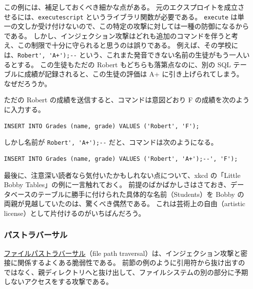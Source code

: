 \documentclass[uplatex]{jsarticle}
\def\label#1{}%
\begin{document}
\begin{rem}[複数文の実行を禁じても防御にはならない]\label{rem:ch10-execute-single-statement}
この例には、補足しておくべき細かな点がある。
元のエクスプロイトを成立させるには、\texttt{executescript} というライブラリ関数が必要である。
\texttt{execute} は単一の文しか受け付けないので、この特定の攻撃に対しては一種の防御になるからである。
しかし、インジェクション攻撃はどれも追加のコマンドを伴うと考え、この制限で十分に守られると思うのは誤りである。
例えば、その学校には、\verb|Robert', 'A+');--| という、これまた発音できない名前の生徒がもう一人いるとする。
この生徒もただの Robert もどちらも落第点なのに、別の SQL テーブルに成績が記録されると、この生徒の評価は A+ に引き上げられてしまう。
なぜだろうか。

ただの Robert の成績を送信すると、コマンドは意図どおり F の成績を次のように入力する。
\begin{verbatim}
INSERT INTO Grades (name, grade) VALUES ('Robert', 'F');
\end{verbatim}
しかし名前が \verb|Robert', 'A+');--| だと、コマンドは次のようになる。
\begin{verbatim}
INSERT INTO Grades (name, grade) VALUES ('Robert', 'A+');--', 'F');
\end{verbatim}
\end{rem}

最後に、注意深い読者なら気付いたかもしれない点について、xkcd の「Little Bobby Tables」の例に一言触れておく。
前提のばかばかしさはさておき、データベースのテーブルに勝手に付けられた具体的な名前（Students）を Bobby の両親が見越していたのは、驚くべき偶然である。
これは芸術上の自由（artistic license）として片付けるのがいちばんだろう。

\subsubsection{パストラバーサル}

\underline{ファイルパストラバーサル}（file path traversal）は、インジェクション攻撃と密接に関係するよくある脆弱性である。
前節の例のように引用符から抜け出すのではなく、親ディレクトリへと抜け出して、ファイルシステムの別の部分に予期しないアクセスをする攻撃である。
\end{document}

